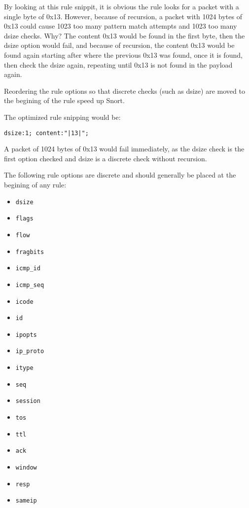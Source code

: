 \documentclass[english]{report}
\begin{document}
By looking at this rule snippit, it is obvious the rule looks for a packet with
a single byte of 0x13.  However, because of recursion, a packet with 1024 bytes
of 0x13 could cause 1023 too many pattern match attempts and 1023 too many
dsize checks.  Why?  The content 0x13 would be found in the first byte, then
the dsize option would fail, and because of recursion, the content 0x13 would
be found again starting after where the previous 0x13 was found, once it is
found, then check the dsize again, repeating until 0x13 is not found in the
payload again.

Reordering the rule options so that discrete checks (such as dsize) are moved to the begining of the rule speed up Snort.  

The optimized rule snipping would be:
\begin{verbatim}
dsize:1; content:"|13|";
\end{verbatim}

A packet of 1024 bytes of 0x13 would fail immediately, as the dsize check is
the first option checked and dsize is a discrete check without recursion.

The following rule options are discrete and should generally be placed at the
begining of any rule:

\begin{itemize}
\item \texttt{dsize}
\item \texttt{flags}
\item \texttt{flow}
\item \texttt{fragbits}
\item \texttt{icmp\_id}
\item \texttt{icmp\_seq} 
\item \texttt{icode} 
\item \texttt{id}
\item \texttt{ipopts}
\item \texttt{ip\_proto} 
\item \texttt{itype} 
\item \texttt{seq}
\item \texttt{session} 
\item \texttt{tos}
\item \texttt{ttl}
\item \texttt{ack}
\item \texttt{window}
\item \texttt{resp} 
\item \texttt{sameip}
\end{itemize}
\end{document}
